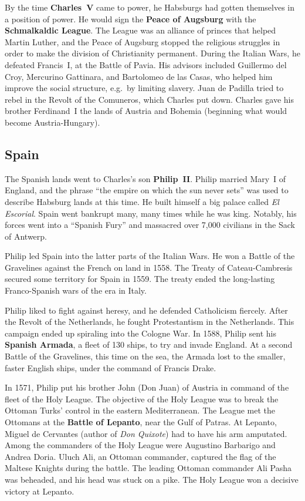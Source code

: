 By the time \textbf{Charles~V} came to power, he Habsburgs had gotten themselves in a position of power.
He would sign the \textbf{Peace of Augsburg} with the \textbf{Schmalkaldic League}.
The League was an alliance of princes that helped Martin Luther,
and the Peace of Augsburg stopped the religious struggles in order to make the division of Christianity permanent.
During the Italian Wars, he defeated Francis~I, at the Battle of Pavia.
His advisors included Guillermo del Croy, Mercurino Gattinara, and Bartolomeo de las Casas,
who helped him improve the social structure, e.g.\ by limiting slavery.
Juan de Padilla tried to rebel in the Revolt of the Comuneros, which Charles put down.
Charles gave his brother Ferdinand~I the lands of Austria and Bohemia (beginning what would become Austria-Hungary).

\subsection*{Spain}

The Spanish lands went to Charles's son \textbf{Philip~II}.
Philip married Mary~I of England, and the phrase ``the empire on which the sun never sets''
was used to describe Habsburg lands at this time.
He built himself a big palace called \textit{El Escorial}.
Spain went bankrupt many, many times while he was king.
Notably, his forces went into a ``Spanish Fury'' and massacred over 7,000 civilians in the Sack of Antwerp.

Philip led Spain into the latter parts of the Italian Wars.
He won a Battle of the Gravelines against the French on land in 1558.
The Treaty of Cateau-Cambresis secured some territory for Spain in 1559.
The treaty ended the long-lasting Franco-Spanish wars of the era in Italy.

Philip liked to fight against heresy, and he defended Catholicism fiercely.
After the Revolt of the Netherlands, he fought Protestantism in the Netherlands.
This campaign ended up spiraling into the Cologne War.
In 1588, Philip sent his \textbf{Spanish Armada}, a fleet of 130 ships, to try and invade England.
At a second Battle of the Gravelines, this time on the sea,
the Armada lost to the smaller, faster English ships, under the command of Francis Drake.

In 1571, Philip put his brother John (Don Juan) of Austria in command of the fleet of the Holy League.
The objective of the Holy League was to break the Ottoman Turks' control in the eastern Mediterranean.
The League met the Ottomans at the \textbf{Battle of Lepanto}, near the Gulf of Patras.
At Lepanto, Miguel de Cervantes (author of \textit{Don Quixote}) had to have his arm amputated.
Among the commanders of the Holy League were Augustino Barbarigo and Andrea Doria.
Uluch Ali, an Ottoman commander, captured the flag of the Maltese Knights during the battle.
The leading Ottoman commander Ali Pasha was beheaded, and his head was stuck on a pike.
The Holy League won a decisive victory at Lepanto.

